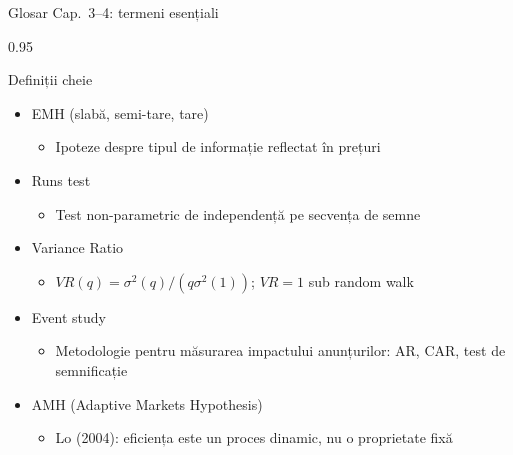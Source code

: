 \documentclass[9pt, aspectratio=169, t]{beamer}
\begin{document}
\begin{frame}[shrink=25]{Glosar Cap.~3--4: termeni esențiali}
\begin{cminipage}{0.95\textwidth}
\begin{block}{Definiții cheie}
\begin{itemize}
    \begin{itemize}\setlength{\itemsep}{0pt}
        \item Estimator pentru indicele cozii $\alpha$ bazat pe ordinea statisticilor extreme
    \end{itemize}
    \item EMH (slabă, semi-tare, tare)
    \begin{itemize}\setlength{\itemsep}{0pt}
        \item Ipoteze despre tipul de informație reflectat în prețuri
    \end{itemize}
    \item Runs test
    \begin{itemize}\setlength{\itemsep}{0pt}
        \item Test non-parametric de independență pe secvența de semne
    \end{itemize}
    \item Variance Ratio
    \begin{itemize}\setlength{\itemsep}{0pt}
        \item $VR(q) = \sigma^2(q)/(q\sigma^2(1))$; $VR = 1$ sub random walk
    \end{itemize}
    \item Event study
    \begin{itemize}\setlength{\itemsep}{0pt}
        \item Metodologie pentru măsurarea impactului anunțurilor: AR, CAR, test de semnificație
    \end{itemize}
    \item AMH (Adaptive Markets Hypothesis)
    \begin{itemize}\setlength{\itemsep}{0pt}
        \item Lo (2004): eficiența este un proces dinamic, nu o proprietate fixă
    \end{itemize}
\end{itemize}
\end{block}
\end{cminipage}
\end{frame}
\end{document}
